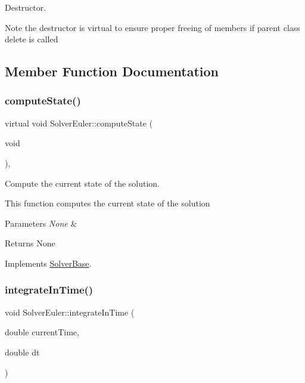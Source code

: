 Destructor. 

Note the destructor is virtual to ensure proper freeing of members if parent class delete is called 

\subsection{Member Function Documentation}
\mbox{\label{class_solver_euler_a5aa41447d61bd488d39ad12f97022473}} 
\subsubsection{\texorpdfstring{compute\+State()}{computeState()}}
{\footnotesize\ttfamily virtual void Solver\+Euler\+::compute\+State (\begin{DoxyParamCaption}\item[{void}]{ }\end{DoxyParamCaption})\hspace{0.3cm}{\ttfamily [inline]}, {\ttfamily [virtual]}}



Compute the current state of the solution. 

This function computes the current state of the solution 
\begin{DoxyParams}{Parameters}
{\em None} & \\
\hline
\end{DoxyParams}
\begin{DoxyReturn}{Returns}
None 
\end{DoxyReturn}


Implements \mbox{\hyperlink{class_solver_base_a818006b80f29f641b6784905e1babe0f}{Solver\+Base}}.

\mbox{\label{class_solver_euler_a64caa7276a35f9e5408bec75bc2d3189}} 
\subsubsection{\texorpdfstring{integrate\+In\+Time()}{integrateInTime()}}
{\footnotesize\ttfamily void Solver\+Euler\+::integrate\+In\+Time (\begin{DoxyParamCaption}\item[{double}]{current\+Time,  }\item[{double}]{dt }\end{DoxyParamCaption})\hspace{0.3cm}{\ttfamily [virtual]}}



